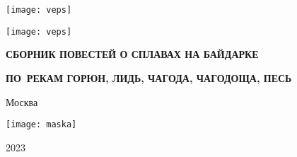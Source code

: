 \begin{titlepage}
	\newpage
	\begin{center}
		\Large \textbf \MyVarAuthorName
	\end{center}	
	\vspace{1.75cm}	
	\begin{center}
	\texttt{[image: veps]}
	\end{center}	
	\begin{center}
		\Huge{}
	\end{center}	
%
	\begin{center}
	\texttt{[image: veps]}
	\end{center}
%
	\begin{center}
		\footnotesize
%	
		{
		\textbf{СБОРНИК ПОВЕСТЕЙ О СПЛАВАХ НА БАЙДАРКЕ}}
		
		{
		\textbf{ПО~РЕКАМ ГОРЮН, ЛИДЬ, ЧАГОДА, ЧАГОДОЩА, ПЕСЬ}}		
	\end{center}
%
	\vspace{\fill}	
	\begin{center}\normalsize Москва\end{center}
	\vspace{-1.1cm}
	\begin{center}\texttt{[image: maska]}\end{center}
	\vspace{-1.24cm}
	\begin{center}\normalsize 2023\end{center}	
\end{titlepage}